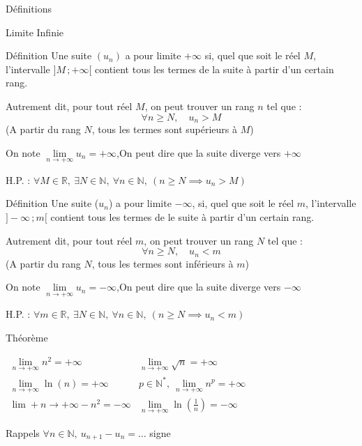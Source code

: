 \documentclass{cours}
\begin{document}
    \begin{Gpartie}{Définitions} 
        \begin{Spartie}{Limite Infinie}
            \begin{SSpartie}{Définition} 
                Une suite $(u_n)$ a pour limite $+\infty$ si, quel que soit le réel $M$, l'intervalle $\big]M\,;+\infty\big[$ contient tous les termes de la suite à partir d'un certain rang.

                Autrement dit, pour tout réel $M$, on peut trouver un rang $n$ tel que : \[\forall n\geq N,\quad u_n>M\]
                (A partir du rang $N$, tous les termes sont supérieurs à $M$)

                On note $\lim\limits_{n\to +\infty} u_n=+\infty$,\quad On peut dire que la suite diverge vers $+\infty$

                H.P. : $\forall M\in\mathbb{R},\ \exists N\in\mathbb{N},\ \forall n\in\mathbb{N},\ (n\geq N\implies u_n>M)$
            \end{SSpartie}
            \begin{SSpartie}{Définition} 
                Une suite ($u_n$) a pour limite $-\infty$, si, quel que soit le réel $m$, l'intervalle $\big]-\infty\,;m\big[$ contient tous les termes de le suite à partir d'un certain rang.

                Autrement dit, pour tout réel $m$, on peut trouver un rang $N$ tel que : \[\forall n\geq N,\quad u_n<m\]
                (A partir du rang $N$, tous les termes sont inférieurs à $m$)

                On note $\lim\limits_{n\to +\infty} u_n=-\infty$,\quad On peut dire que la suite diverge vers $-\infty$

                H.P. : $\forall m\in\mathbb{R},\ \exists N\in\mathbb{N},\ \forall n\in\mathbb{N},\ (n\geq N\implies u_n<m)$
            \end{SSpartie}
            \begin{SSpartie}{Théorème}
                \begin{center}$\begin{array}{cc}
                    \lim\limits_{n\to +\infty} n^2=+\infty & \lim\limits_{n\to +\infty} \sqrt{n}=+\infty \\
    
                    \lim\limits_{n\to +\infty} \ln(n)=+\infty & p\in\mathbb{N^*},\ \lim\limits_{n\to +\infty} n^p=+\infty \\
                    \lim\limits+{n\to +\infty} -n^2=-\infty & \lim\limits_{n\to +\infty} \ln\left(\frac{1}{n}\right)=-\infty
                \end{array}$\end{center}
            \end{SSpartie}
            \begin{SSpartie}{Rappels} 
                $\forall n\in\mathbb{N},\ u_{n+1}-u_n=\dotsc$ signe


\end{SSpartie}
\end{Spartie}
\end{Gpartie}
\end{document}
